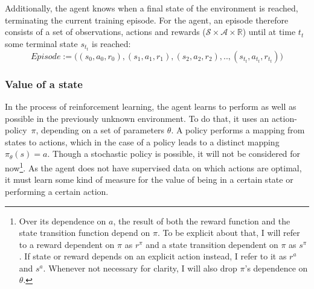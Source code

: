 Additionally, the agent knows when a final state of the environment is reached, terminating the current training episode. For the agent, an episode therefore consists of a set of observations, actions and rewards ($\mathcal{S} \times \mathcal{A} \times \mathds{R}$) until at time $t_t$ some terminal state $s_{t_t}$ is reached: $$Episode := \big((s_0, a_0, r_0), (s_1, a_1, r_1), (s_2,a_2,r_2), .., (s_{t_t}, a_{t_t}, r_{t_t})\big)$$

\subsubsection{Value of a state}

In the process of reinforcement learning, the agent learns to perform as well as possible in the previously unknown environment. To do that, it uses an \mbox{action-policy $\pi$,} depending on a set of parameters $\theta$. A policy performs a mapping from states to actions, which in the case of a  policy leads to a distinct mapping $\pi_\theta(s) = a$. Though a stochastic policy is possible, it will not be considered for now\footnote{Over its dependence on $a$, the result of both the reward function and the state transition function depend on $\pi$. To be explicit about that, I will refer to a reward dependent on $\pi$ as $r^\pi$ and a state transition dependent on $\pi$ as $s^\pi$. If state or reward depends on an explicit action instead, I refer to it as $r^a$ and $s^a$. Whenever not necessary for clarity, I will also drop $\pi$'s dependence on $\theta$.}. %
As the agent does not have supervised data on which actions are optimal, it must learn some kind of measure for the value of being in a certain state or performing a certain action.

